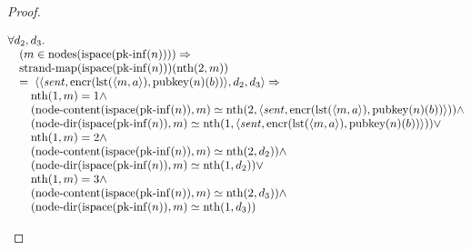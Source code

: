 \documentclass[11pt]{article}
\theoremstyle{plain}
\begin{document}
\begin{proof}
\begin{itemize}[leftmargin=2.8em, itemsep=4pt, parsep=1pt]
\begin{itemize}[leftmargin=2.8em, itemsep=4pt, parsep=1pt]
\begin{equation*}
\begin{array}{@{}l@{}}
\begin{array}{@{}l@{}} \forall d_{2}, d_{3}. \\ \quad (m \in \operatorname{nodes}(\operatorname{ispace}(\operatorname{pk\text{-}inf}(n)))) \Rightarrow  \\ \quad \operatorname{strand\text{-}map}(\operatorname{ispace}(\operatorname{pk\text{-}inf}(n)))(\operatorname{nth}(2, m)) \\ \quad =\; \langle \langle \mathit{sent}, \operatorname{encr}(\operatorname{lst}(\langle m, a \rangle), \operatorname{pubkey}(n)(b)) \rangle, d_{2}, d_{3} \rangle \Rightarrow \\ \quad \quad \operatorname{nth}(1, m) = 1 \wedge \\ \quad \quad (\operatorname{node\text{-}content}(\operatorname{ispace}(\operatorname{pk\text{-}inf}(n)), m) \simeq \operatorname{nth}(2, \langle \mathit{sent}, \operatorname{encr}(\operatorname{lst}(\langle m, a \rangle), \operatorname{pubkey}(n)(b)) \rangle)) \wedge \\ \quad \quad (\operatorname{node\text{-}dir}(\operatorname{ispace}(\operatorname{pk\text{-}inf}(n)), m) \simeq \operatorname{nth}(1, \langle \mathit{sent}, \operatorname{encr}(\operatorname{lst}(\langle m, a \rangle), \operatorname{pubkey}(n)(b)) \rangle)) \vee \\ \quad \quad \operatorname{nth}(1, m) = 2 \wedge \\ \quad \quad (\operatorname{node\text{-}content}(\operatorname{ispace}(\operatorname{pk\text{-}inf}(n)), m) \simeq \operatorname{nth}(2, d_{2})) \wedge \\ \quad \quad (\operatorname{node\text{-}dir}(\operatorname{ispace}(\operatorname{pk\text{-}inf}(n)), m) \simeq \operatorname{nth}(1, d_{2})) \vee \\ \quad \quad \operatorname{nth}(1, m) = 3 \wedge \\ \quad \quad (\operatorname{node\text{-}content}(\operatorname{ispace}(\operatorname{pk\text{-}inf}(n)), m) \simeq \operatorname{nth}(2, d_{3})) \wedge \\ \quad \quad (\operatorname{node\text{-}dir}(\operatorname{ispace}(\operatorname{pk\text{-}inf}(n)), m) \simeq \operatorname{nth}(1, d_{3})) \end{array} \\

\end{array}
\end{equation*}
\end{itemize}
\end{itemize}
\end{proof}
\end{document}
